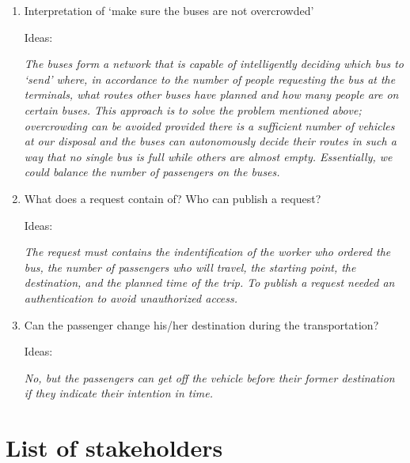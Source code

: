 \documentclass[a4paper]{article}
\begin{document}
\begin{enumerate}
	\item Interpretation of ‘make sure the buses are not overcrowded’

		Ideas:

		\textit{The buses form a network that is capable of
			intelligently deciding which bus to ‘send’ where, in
			accordance to the number of people requesting the bus at
			the terminals, what routes other buses have planned and
			how many people are on certain buses. This approach is
			to solve the problem mentioned above; overcrowding can
			be avoided provided there is a sufficient number of
			vehicles at our disposal and the buses can autonomously
			decide their routes in such a way that no single bus is
			full while others are almost empty. Essentially, we
			could balance the number of passengers on the buses.}

	\item What does a request contain of? Who can publish a request?

		Ideas:

		\textit{The request must contains the indentification of the
			worker who ordered the bus, the number of passengers who
			will travel, the starting point, the destination, and
			the planned time of the trip. To publish a request
			needed an authentication to avoid unauthorized access.}

	\item Can the passenger change his/her destination during the
		transportation?

		Ideas:

		\textit{No, but the passengers can get off the vehicle before
			their former destination if they indicate their
			intention in time.}
\end{enumerate}


\section{List of stakeholders}

%
%
%
%
%
\end{document}
